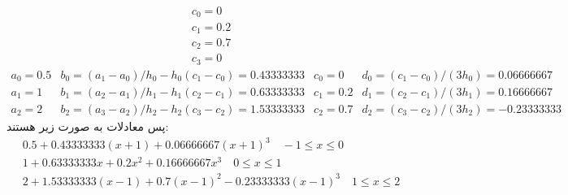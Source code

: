 \documentclass[]{article}
\begin{document}
\begin{gather*}
    c_0 = 0\\
    c_1 = 0.2\\
    c_2 = 0.7\\
    c_3 = 0
\end{gather*}
\[
\begin{array}{cccc}
    a_0 = 0.5 & b_0 = (a_1 - a_0)/h_0 - h_0 (c_1-c_0) = 0.43333333 & c_0 = 0 & d_0 = (c_1 - c_0) / (3h_0) = 0.06666667\\
    a_1 = 1 & b_1 = (a_2 - a_1)/h_1 - h_1 (c_2-c_1) = 0.63333333 & c_1 = 0.2 & d_1 = (c_2 - c_1) / (3h_1) = 0.16666667\\
    a_2 = 2 & b_2 = (a_3 - a_2)/h_2 - h_2 (c_3-c_2) = 1.53333333 & c_2 = 0.7 & d_2 = (c_3 - c_2) / (3h_2) = -0.23333333
\end{array}
\]
پس معادلات به صورت زیر هستند:
\begin{gather*}
    0.5 + 0.43333333 (x + 1) + 0.06666667 (x + 1)^3 \quad -1 \le x \le 0\\
    1 + 0.63333333 x + 0.2x^2 + 0.16666667 x^3 \quad 0 \le x \le 1\\
    2 + 1.53333333 (x - 1) + 0.7 (x-1)^2 -0.23333333 (x - 1)^3 \quad 1 \le x \le 2
\end{gather*}
\end{document}
